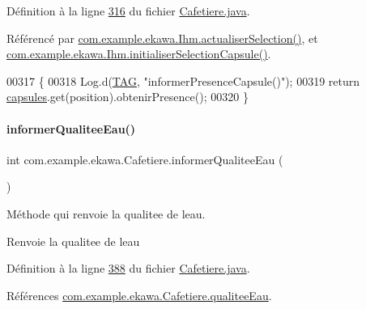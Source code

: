 Définition à la ligne \hyperlink{_cafetiere_8java_source_l00316}{316} du fichier \hyperlink{_cafetiere_8java_source}{Cafetiere.\+java}.



Référencé par \hyperlink{_ihm_8java_source_l00892}{com.\+example.\+ekawa.\+Ihm.\+actualiser\+Selection()}, et \hyperlink{_ihm_8java_source_l00413}{com.\+example.\+ekawa.\+Ihm.\+initialiser\+Selection\+Capsule()}.


\begin{DoxyCode}
00317     \{
00318         Log.d(\hyperlink{classcom_1_1example_1_1ekawa_1_1_cafetiere_aa0c1fd99a2508b06c462aea17034aa91}{TAG}, \textcolor{stringliteral}{"informerPresenceCapsule()"});
00319         \textcolor{keywordflow}{return} \hyperlink{classcom_1_1example_1_1ekawa_1_1_cafetiere_ae9590789503a6ae2094c86cf93299821}{capsules}.get(position).obtenirPresence();
00320     \}
\end{DoxyCode}
\mbox{\label{classcom_1_1example_1_1ekawa_1_1_cafetiere_a1c04bcbd87ed47f8abf08e36e0629e13}} 
\paragraph{\texorpdfstring{informer\+Qualitee\+Eau()}{informerQualiteeEau()}}
{\footnotesize\ttfamily int com.\+example.\+ekawa.\+Cafetiere.\+informer\+Qualitee\+Eau (\begin{DoxyParamCaption}{ }\end{DoxyParamCaption})}



Méthode qui renvoie la qualitee de l\textquotesingle{}eau. 

\begin{DoxyReturn}{Renvoie}
la qualitee de l\textquotesingle{}eau 
\end{DoxyReturn}


Définition à la ligne \hyperlink{_cafetiere_8java_source_l00388}{388} du fichier \hyperlink{_cafetiere_8java_source}{Cafetiere.\+java}.



Références \hyperlink{_cafetiere_8java_source_l00102}{com.\+example.\+ekawa.\+Cafetiere.\+qualitee\+Eau}.



